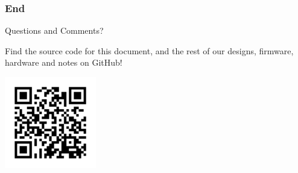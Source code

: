\documentclass[aspectratio=169]{beamer}
\begin{document}
\begin{frame}
    \frametitle{End}

    \begin{block}{}
        \begin{center}
            \Huge Questions and Comments?
        \end{center}
    \end{block}

    \begin{center}
        Find the source code for this document, and the rest of our designs, firmware, hardware
        and notes on GitHub!

        \includegraphics[height=4cm]{github_qr}
    \end{center}

\end{frame}
\end{document}
